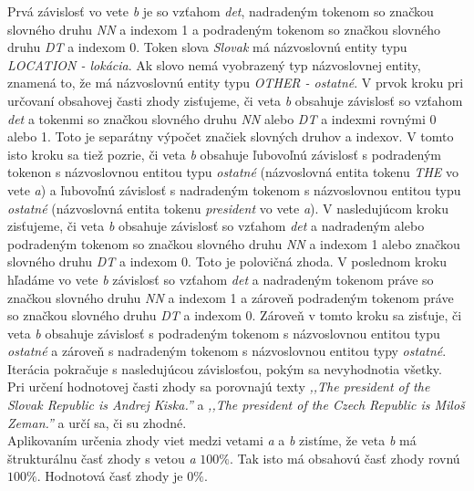 Prvá závislosť vo vete \textit{b} je so vzťahom \textit{det}, nadradeným tokenom so značkou slovného druhu \textit{NN} a indexom 1 a podradeným tokenom so značkou slovného druhu \textit{DT} a indexom 0. Token slova \textit{Slovak} má názvoslovnú entity typu \textit{LOCATION - lokácia}. Ak slovo nemá vyobrazený typ názvoslovnej entity, znamená to, že má názvoslovnú entity typu \textit{OTHER - ostatné}. V prvok kroku pri určovaní obsahovej časti zhody zisťujeme, či veta \textit{b} obsahuje závislosť so vzťahom \textit{det} a tokenmi so značkou slovného druhu \textit{NN} alebo \textit{DT} a indexmi rovnými 0 alebo 1. Toto je separátny výpočet značiek slovných druhov a indexov. V tomto isto kroku sa tiež pozrie, či veta \textit{b} obsahuje ľubovoľnú závislosť s podradeným tokenon s názvoslovnou entitou typu \textit{ostatné} (názvoslovná entita tokenu \textit{THE} vo vete \textit{a}) a ľubovoľnú závislosť s nadradeným tokenom s názvoslovnou entitou typu \textit{ostatné} (názvoslovná entita tokenu \textit{president} vo vete \textit{a}). V nasledujúcom kroku zisťujeme, či veta \textit{b} obsahuje závislosť so vzťahom \textit{det} a nadradeným alebo podradeným tokenom so značkou slovného druhu \textit{NN} a indexom 1 alebo značkou slovného druhu \textit{DT} a indexom 0. Toto je polovičná zhoda. V poslednom kroku hľadáme vo vete \textit{b} závislosť so vzťahom \textit{det} a nadradeným tokenom práve so značkou slovného druhu \textit{NN} a indexom 1 a zároveň podradeným tokenom práve so značkou slovného druhu \textit{DT} a indexom 0. Zároveň v tomto kroku sa zisťuje, či veta \textit{b} obsahuje závislosť s podradeným tokenom s názvoslovnou entitou typu \textit{ostatné} a zároveň s nadradeným tokenom s názvoslovnou entitou typy \textit{ostatné}. Iterácia pokračuje s nasledujúcou závislosťou, pokým sa nevyhodnotia všetky. \\

Pri určení hodnotovej časti zhody sa porovnajú texty \textit{,,The president of the Slovak Republic is Andrej Kiska.''} a \textit{,,The president of the Czech Republic is Miloš Zeman.''} a určí sa, či su zhodné. \\

Aplikovaním určenia zhody viet medzi vetami \textit{a} a \textit{b} zistíme, že veta \textit{b} má štrukturálnu časť zhody s vetou \textit{a} $100\%$. Tak isto má obsahovú časť zhody rovnú $100\%$. Hodnotová časť zhody je $0\%$.


